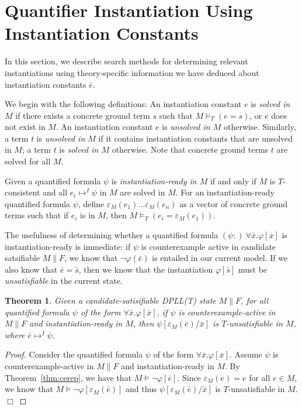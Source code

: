 \documentclass{llncs}
\newtheorem{thm}{Theorem}
\begin{document}
\section{Quantifier Instantiation Using Instantiation Constants}

In this section, we describe search methods for determining relevant instantiations using theory-specific information we have deduced about instantiation constants $\bar{e}$.

We begin with the following definitions:
An instantiation constant $e$ is \emph{solved in $M$} if there exists a concrete ground term $s$ such that $M \models_T (e = s)$, or $e$ does not exist in $M$.
An instantiation constant $e$ is \emph{unsolved in $M$} otherwise.
Similarly, a term $t$ is \emph{unsolved in $M$} if it contains instantiation constants that are unsolved in $M$; a term $t$ is \emph{solved in $M$} otherwise.
Note that concrete ground terms $t$ are solved for all $M$.

Given a quantified formula $\psi$ is \emph{instantiation-ready in $M$} if and only if $M$ is $T$-consistent and all $e_i \mapsto^I \psi$ in $M$ are solved in $M$.
For an instantiation-ready quantified formula $\psi$, define $\varepsilon_M( e_1 ) \ldots \varepsilon_M( e_n )$ as a vector of concrete ground terms such that if $e_i$ is in $M$, then $M \models_T (e_i = \varepsilon_M( e_1 ))$.

The usefulness of determining whether a quantified formula $(\psi:) \ \forall \bar{x}. \varphi[ \bar{x} ]$ is instantiation-ready is immediate:  if $\psi$ is counterexample active in candidate satsifiable $M \parallel F$, we know that $\neg \varphi( \bar{e} )$ is entailed in our current model.
If we also know that $\bar{e} = \bar{s}$, then we know that the instantiation $\varphi[ \bar{s} ]$ must be \emph{unsatisfiable} in the current state.

\begin{thm}
\label{thm:instready}
Given a candidate-satisifiable DPLL(T) state $M \parallel F$, for all quantified formula $\psi$ of the form $\forall \bar{x}. \varphi[ \bar{x} ]$, if $\psi$ is counterexample-active in $M \parallel F$ and instantiation-ready in $M$, then $\psi[\varepsilon_M( \bar{e} )/\bar{x}]$ is $T$-unsatisfiable in $M$, where $\bar{e} \mapsto^I \psi$.
\end{thm}
\begin{proof}
Consider the quantified formula $\psi$ of the form $\forall \bar{x}. \varphi[ \bar{x} ]$.
Assume $\psi$ is counterexample-active in $M \parallel F$ and instantiation-ready in $M$.
By Theorem~\ref{thm:cerep}, we have that $M \models \neg \varphi[\bar{e}]$.
Since $\varepsilon_{M}( e ) = e$ for all $e \in M$, we know that $M \models \neg \varphi[\varepsilon_M( \bar{e} )]$ and thus $\psi[\varepsilon_M( \bar{e} )/\bar{x}]$ is $T$-unsatisfiable in $M$. $\Box$
\end{proof}
\end{document}
